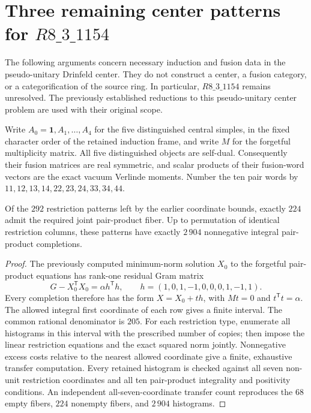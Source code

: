 \section{Three remaining center patterns for \texorpdfstring{$R8\_3\_1154$}{R8-3-1154}}
\label{sec:r1154-three-center-patterns}

The following arguments concern necessary induction and fusion data in the
pseudo-unitary Drinfeld center.  They do not construct a center, a fusion
category, or a categorification of the source ring.  In particular,
$R8\_3\_1154$ remains unresolved.  The previously established reductions to
this pseudo-unitary center problem are used with their original scope.

Write $A_0=\mathbf1,A_1,\ldots,A_4$ for the five distinguished central
simples, in the fixed character order of the retained induction frame, and
write $M$ for the forgetful multiplicity matrix.  All five distinguished
objects are self-dual.  Consequently their fusion matrices are real
symmetric, and scalar products of their fusion-word vectors are the exact
vacuum Verlinde moments.  Number the ten pair words by
$11,12,13,14,22,23,24,33,34,44$.

\begin{proposition}
Of the $292$ restriction patterns left by the earlier coordinate bounds,
exactly $224$ admit the required joint pair-product fiber.  Up to permutation
of identical restriction columns, these patterns have exactly $2\,904$
nonnegative integral pair-product completions.
\end{proposition}
\begin{proof}
The previously computed minimum-norm solution $X_0$ to the forgetful
pair-product equations has rank-one residual Gram matrix
\[
 G-X_0^{\mathsf T}X_0=\alpha h^{\mathsf T}h,
 \qquad h=(1,0,1,-1,0,0,0,1,-1,1).
\]
Every completion therefore has the form $X=X_0+t h$, with
$Mt=0$ and $t^{\mathsf T}t=\alpha$.  The allowed integral first coordinate
of each row gives a finite interval.  The common rational denominator is
$205$.  For each restriction type, enumerate all histograms in this
interval with the prescribed number of copies; then impose the linear
restriction equations and the exact squared norm jointly.  Nonnegative
excess costs relative to the nearest allowed coordinate give a finite,
exhaustive transfer computation.  Every retained histogram is checked
against all seven non-unit restriction coordinates and all ten
pair-product integrality and positivity conditions.  An independent
all-seven-coordinate transfer count reproduces the $68$ empty fibers,
$224$ nonempty fibers, and $2\,904$ histograms.
\end{proof}

